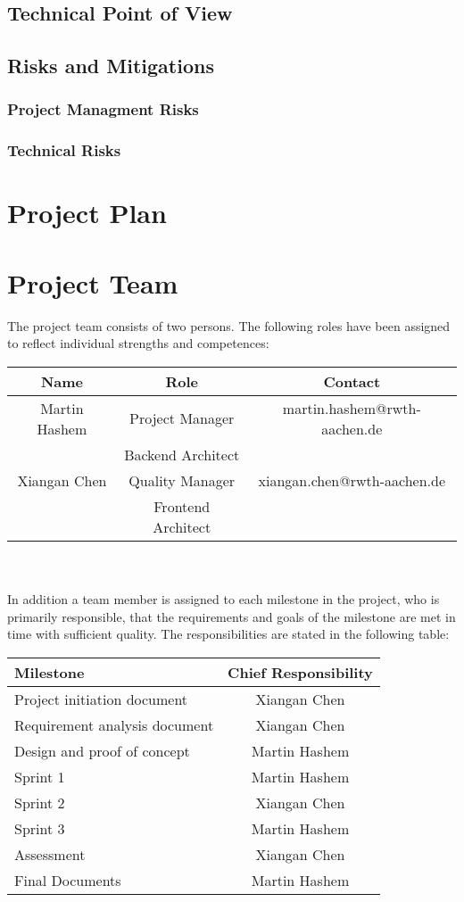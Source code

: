 \documentclass[runningheads]{llncs}
\begin{document}
\subsection{Technical Point of View}
\subsection{Risks and Mitigations}

	\subsubsection{Project Managment Risks}
	\subsubsection{Technical Risks}

\section{Project Plan}
\section{Project Team}
The project team consists of two persons. The following roles have been assigned to reflect individual strengths and competences:\\


\renewcommand\arraystretch{2}
\begin{tabular}{c|cc}
	Name& Role& Contact\\
	\hline
	Martin Hashem& Project Manager& martin.hashem@rwth-aachen.de\\
	& Backend Architect& \\ 
	Xiangan Chen& Quality Manager& xiangan.chen@rwth-aachen.de\\
	& Frontend Architect & \\
\end{tabular}
\\\\[2pt]
In addition a team member is assigned to each milestone in the project, who is primarily
responsible, that the requirements and goals of the milestone are met in time with sufficient quality. The responsibilities are stated in the following table:\\

\begin{tabular}{lc}
	Milestone& Chief Responsibility\\
	\hline
	Project initiation document& Xiangan Chen\\
	Requirement analysis document& Xiangan Chen\\
	Design and proof of concept& Martin Hashem\\
	Sprint 1& Martin Hashem\\
	Sprint 2& Xiangan Chen\\
	Sprint 3& Martin Hashem\\
	Assessment& Xiangan Chen\\
	Final Documents& Martin Hashem\\
\end{tabular}




\end{document}
